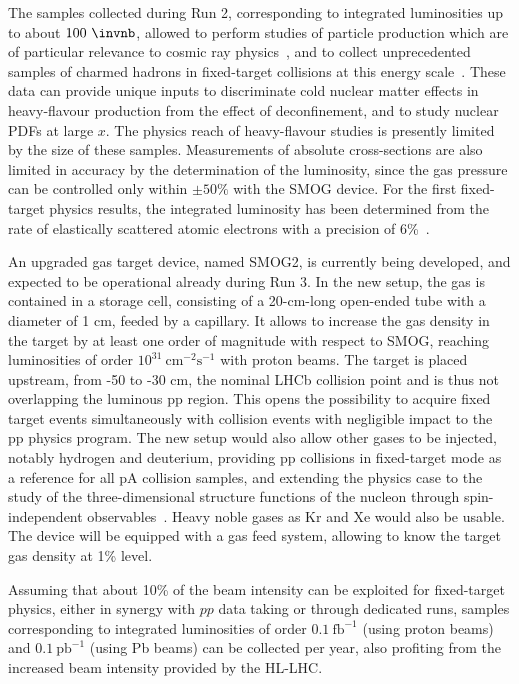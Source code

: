 \documentclass[../report.tex]{subfiles}
\begin{document}
The samples collected during Run 2, corresponding
to integrated luminosities up to about $100~\invnb$, 
allowed to perform 
studies of particle production which are of particular relevance
to cosmic ray physics~\cite{LHCb-PAPER-2018-031}, and to
collect unprecedented samples of charmed hadrons in
fixed-target collisions at this energy
scale~\cite{LHCb-PAPER-2018-023}. 
These data can provide unique inputs to
discriminate cold nuclear matter effects in heavy-flavour production
from the effect of deconfinement, and to study nuclear PDFs 
at large $x$. The physics reach of heavy-flavour studies is presently
limited by the size of these samples. Measurements of absolute
cross-sections are also limited in accuracy by the determination of the
luminosity, since the gas pressure can be controlled only
within $\pm 50\%$ with the SMOG device. For the first fixed-target physics
results, the integrated luminosity has been determined from the rate of
elastically scattered atomic electrons with a precision of
6\%~\cite{LHCb-PAPER-2018-031}. 

An upgraded gas target device, named SMOG2, is currently being developed, and expected
to be operational already during Run 3. 
In the new setup, the gas is contained in a storage cell, consisting
of a 20-cm-long open-ended tube with a diameter of 1 cm, feeded by a capillary.
It allows to increase the gas density in the target
by at least one order of magnitude with respect to SMOG, reaching
luminosities of order $10^{31}~\text{cm}^{-2}\text{s}^{-1}$ with
proton beams.
The target is placed upstream, from -50 to -30 cm, the nominal  LHCb
collision point and is thus not overlapping the luminous pp region.
This opens the possibility to acquire fixed target events
simultaneously with collision events with negligible impact to the
pp physics program.
The new setup would also allow other gases to be injected, notably hydrogen and deuterium, providing
pp collisions in fixed-target mode as a reference for all pA
collision samples, and extending the physics case to the study
of the three-dimensional structure functions of the nucleon through
spin-independent observables~\cite{3dpdf}. Heavy noble gases as Kr
and Xe would also be usable.
The device will be equipped with a gas feed system, allowing
to know the target gas density at 1\% level.

Assuming that about 10\% of the beam intensity can be exploited for
fixed-target physics, either in synergy with $pp$ data taking or through dedicated runs,
samples corresponding to integrated luminosities of order $0.1~\textrm{fb}^{-1}$
(using proton beams) and $0.1~\textrm{pb}^{-1}$ (using Pb beams) 
can be collected per year, also profiting from the increased beam
intensity provided by the HL-LHC.
\end{document}
